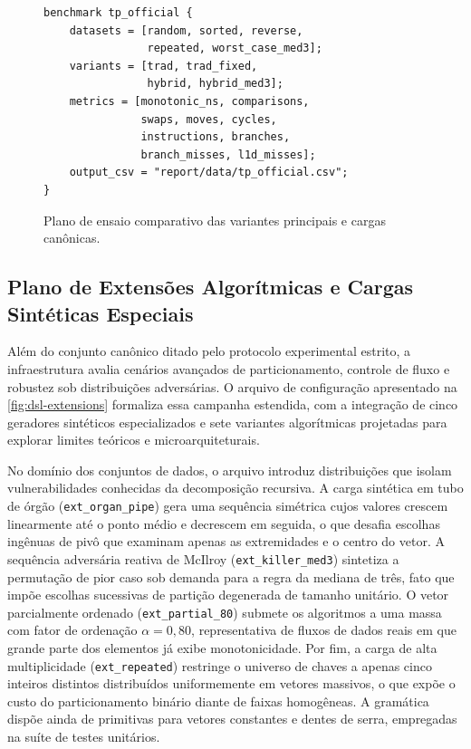 \documentclass[12pt]{article}
\begin{document}
\begin{figure}[htbp]
\begin{minipage}[t]{0.48\textwidth}
\begin{verbatim}
benchmark tp_official {
	datasets = [random, sorted, reverse,
	            repeated, worst_case_med3];
	variants = [trad, trad_fixed,
	            hybrid, hybrid_med3];
	metrics = [monotonic_ns, comparisons,
	           swaps, moves, cycles,
	           instructions, branches,
	           branch_misses, l1d_misses];
	output_csv = "report/data/tp_official.csv";
}
\end{verbatim}
\end{minipage}
\caption{Plano de ensaio comparativo das variantes principais e cargas canônicas.}
\label{fig:dsl-official}
\end{figure}

\clearpage
\subsection{Plano de Extensões Algorítmicas e Cargas Sintéticas Especiais}\label{sec:apendice-dsl-extensoes}

Além do conjunto canônico ditado pelo protocolo experimental estrito, a infraestrutura avalia cenários avançados de particionamento, controle de fluxo e robustez sob distribuições adversárias. O arquivo de configuração apresentado na \cref{fig:dsl-extensions} formaliza essa campanha estendida, com a integração de cinco geradores sintéticos especializados e sete variantes algorítmicas projetadas para explorar limites teóricos e microarquiteturais.

No domínio dos conjuntos de dados, o arquivo introduz distribuições que isolam vulnerabilidades conhecidas da decomposição recursiva. A carga sintética em tubo de órgão (\texttt{ext\_organ\_pipe}) gera uma sequência simétrica cujos valores crescem linearmente até o ponto médio e decrescem em seguida, o que desafia escolhas ingênuas de pivô que examinam apenas as extremidades e o centro do vetor. A sequência adversária reativa de McIlroy (\texttt{ext\_killer\_med3}) sintetiza a permutação de pior caso sob demanda para a regra da mediana de três, fato que impõe escolhas sucessivas de partição degenerada de tamanho unitário. O vetor parcialmente ordenado (\texttt{ext\_partial\_80}) submete os algoritmos a uma massa com fator de ordenação $\alpha = 0{,}80$, representativa de fluxos de dados reais em que grande parte dos elementos já exibe monotonicidade. Por fim, a carga de alta multiplicidade (\texttt{ext\_repeated}) restringe o universo de chaves a apenas cinco inteiros distintos distribuídos uniformemente em vetores massivos, o que expõe o custo do particionamento binário diante de faixas homogêneas. A gramática dispõe ainda de primitivas para vetores constantes e dentes de serra, empregadas na suíte de testes unitários.
\end{document}
